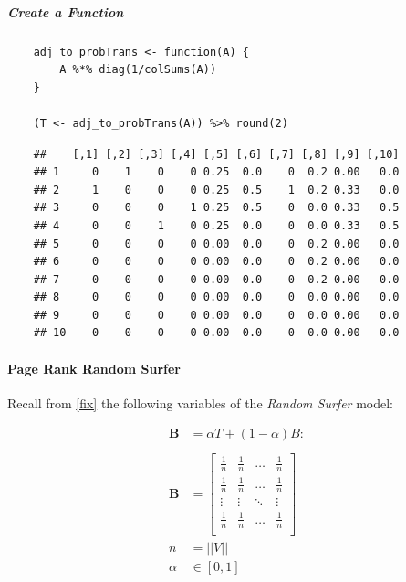 \documentclass[11pt]{article}
\begin{document}
\subparagraph{Create a Function}
\label{create-a-function}
\begin{tcolorbox}
    \begin{verbatim}
    adj_to_probTrans <- function(A) {
        A %*% diag(1/colSums(A))
    }

    (T <- adj_to_probTrans(A)) %>% round(2)
    \end{verbatim}
\tcblower
    \begin{verbatim}
    ##    [,1] [,2] [,3] [,4] [,5] [,6] [,7] [,8] [,9] [,10]
    ## 1     0    1    0    0 0.25  0.0    0  0.2 0.00   0.0
    ## 2     1    0    0    0 0.25  0.5    1  0.2 0.33   0.0
    ## 3     0    0    0    1 0.25  0.5    0  0.0 0.33   0.5
    ## 4     0    0    1    0 0.25  0.0    0  0.0 0.33   0.5
    ## 5     0    0    0    0 0.00  0.0    0  0.2 0.00   0.0
    ## 6     0    0    0    0 0.00  0.0    0  0.2 0.00   0.0
    ## 7     0    0    0    0 0.00  0.0    0  0.2 0.00   0.0
    ## 8     0    0    0    0 0.00  0.0    0  0.0 0.00   0.0
    ## 9     0    0    0    0 0.00  0.0    0  0.0 0.00   0.0
    ## 10    0    0    0    0 0.00  0.0    0  0.0 0.00   0.0
    \end{verbatim}
\end{tcolorbox}

\paragraph{Page Rank Random Surfer}
\label{page-rank-random-surfer}
Recall from \ref{fix} the following variables of the \emph{Random Surfer} model:


\begin{align}
    \mathbf{B} &= \alpha T +  \left( 1- \alpha \right)B :\\
\ \\
    \mathbf{B}&= \begin{bmatrix}
    \frac{1}{n} & \frac{1}{n} & \ldots & \frac{1}{n} \\
    \frac{1}{n} & \frac{1}{n} & \ldots & \frac{1}{n} \\
        \vdots      & \vdots      & \ddots & \vdots  \\
    \frac{1}{n} & \frac{1}{n} & \ldots & \frac{1}{n} \\
    \end{bmatrix} \label{eq:bgval1} \\
    n&= \left| \left| V \right| \right| \\
    \alpha &\in [0,1]
\end{align}
\end{document}
